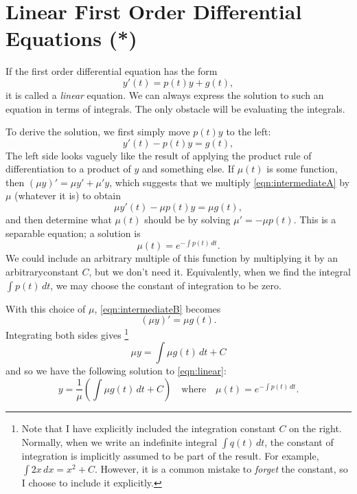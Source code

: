 \documentclass[reqno]{immbook}
\begin{document}
\section{Linear First Order Differential Equations (*)}

If the first order differential equation has the form
\begin{equation}
    y'(t) = p(t) y + g(t),
\label{eqn:linear}
\end{equation}
it is called a \emph{linear} equation.
We can always express the solution to such an equation
in terms of integrals.  The only obstacle will be
evaluating the integrals.

To derive the solution, we first simply move $p(t)y$ to the left:
\begin{equation}
    y'(t) - p(t) y =  g(t),
\label{eqn:intermediateA}
\end{equation}
The left side looks vaguely like the result of applying the
product rule of differentiation to a product of $y$ and something else.
If $\mu(t)$ is some function, then $(\mu y)' = \mu y' + \mu' y$,
which suggests that we multiply \eqref{eqn:intermediateA}
by $\mu$ (whatever it is)
to obtain
\begin{equation}
    \mu y'(t) - \mu p(t) y =  \mu g(t),
\label{eqn:intermediateB}
\end{equation}
and then determine what $\mu(t)$ should
be by solving $\mu' = -\mu p(t)$.
This is a separable equation; a solution is
\begin{equation}
   \mu(t) = e^{-\int p(t)\, dt}.
\end{equation}
We could include an arbitrary multiple of this function
by multiplying it by an arbitraryconstant $C$, but we
don't need it.  Equivalently, when we find the integral
$\int p(t)\,dt$, we may choose the constant of integration
to be zero.

With this choice of $\mu$, 
\eqref{eqn:intermediateB} becomes
\begin{equation}
    (\mu y)' =  \mu g(t).
\label{eqn:intermediateC}
\end{equation}
Integrating both sides gives%
\footnote{Note that I have explicitly included the integration
constant $C$ on the right.  Normally, when we write an indefinite
integral $\int q(t)\, dt$, the constant of integration is implicitly
assumed to be part of the result. For example, $\int 2x\,dx = x^2+C$.
However, it is a common mistake to \emph{forget} the constant, so
I choose to include it explicitly.}
\begin{equation}
    \mu y =  \int \mu g(t) \, dt + C
\label{eqn:intermediateD}
\end{equation}
and so we have the following solution
to \eqref{eqn:linear}:
\begin{equation}
    y =  \frac{1}{\mu}\left(\int \mu g(t) \, dt + C\right)
    \quad \textrm{where} \quad
    \mu(t) = e^{-\int p(t)\, dt}.
\label{eqn:linearsolution}
\end{equation}
\end{document}
